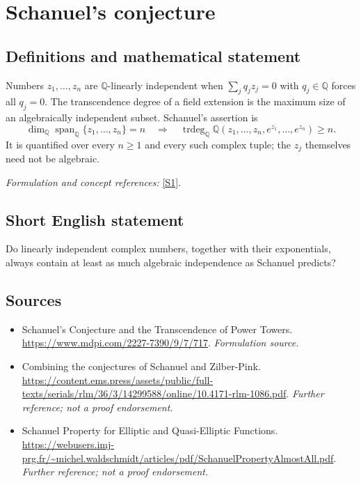 \documentclass[11pt]{article}
\begin{document}
\section*{\texorpdfstring{Schanuel's conjecture}{Schanuel's conjecture}}\label{28}
\subsection{Definitions and mathematical statement}
Numbers $z_1,\ldots,z_n$ are ${\mathbb{Q}}$-linearly independent when $\sum_jq_jz_j=0$ with $q_j\in{\mathbb{Q}}$ forces all $q_j=0$. The transcendence degree of a field extension is the maximum size of an algebraically independent subset. Schanuel's assertion is
\[
 \dim_{{\mathbb{Q}}}\operatorname{span}_{{\mathbb{Q}}}\{z_1,\ldots,z_n\}=n
 \quad\Longrightarrow\quad
 \operatorname{trdeg}_{{\mathbb{Q}}}{\mathbb{Q}}(z_1,\ldots,z_n,e^{z_1},\ldots,e^{z_n})\ge n.
\]
It is quantified over every $n\ge1$ and every such complex tuple; the $z_j$ themselves need not be algebraic.
\par\smallskip\textit{Formulation and concept references:} \href{https://www.mdpi.com/2227-7390/9/7/717}{[S1]}.

\subsection{Short English statement}
Do linearly independent complex numbers, together with their exponentials, always contain at least as much algebraic independence as Schanuel predicts?
\subsection{Sources}
\begin{itemize}
\item[S1]Schanuel's Conjecture and the Transcendence of Power Towers.
\url{https://www.mdpi.com/2227-7390/9/7/717}.
\textit{Formulation source.}
\item[S2]Combining the conjectures of Schanuel and Zilber-Pink.
\url{https://content.ems.press/assets/public/full-texts/serials/rlm/36/3/14299588/online/10.4171-rlm-1086.pdf}.
\textit{Further reference; not a proof endorsement.}
\item[S3]Schanuel Property for Elliptic and Quasi-Elliptic Functions.
\url{https://webusers.imj-prg.fr/~michel.waldschmidt/articles/pdf/SchanuelPropertyAlmostAll.pdf}.
\textit{Further reference; not a proof endorsement.}
\end{itemize}
\end{document}
